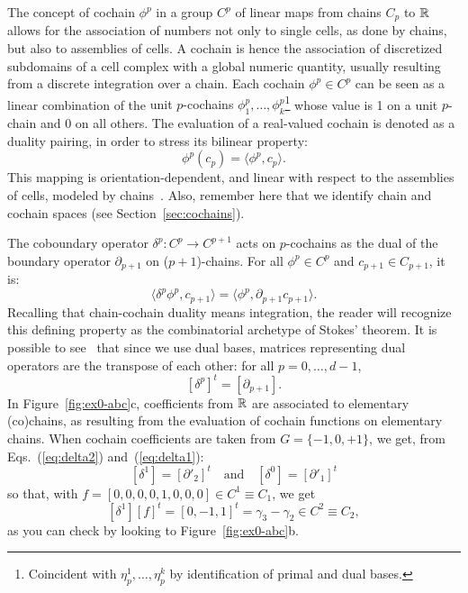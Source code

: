 {
\begin{example}\label{exampleb}
The concept of cochain $\phi^p$ in a group $C^p$ of linear maps from chains $C_p$ to $\mathbb{R}$ allows for the association of numbers not only to single cells, as done by chains, but also to assemblies of cells. 
{A cochain is hence the association of  discretized subdomains of a cell complex with a global numeric quantity, usually resulting from a discrete integration over a chain. }
Each cochain $\phi^p \in C^p$ can be seen as a linear combination of the {
unit $p$-cochains $\phi_1^p,\ldots, \phi_k^p$}\footnote{{Coincident with $\eta^1_p,\ldots, \eta^k_p$ by identification of primal and dual bases.}} whose value is 1 on a unit $p$-chain and 0 on all others.
The evaluation of a real-valued cochain is denoted as a duality pairing, in order to stress its bilinear property:
\[
\phi^p ( c_p ) = \langle \phi^p, c_p \rangle .
\]
This mapping is orientation-dependent, and linear with respect to the assemblies of cells, modeled by chains~\cite{hinzl:thesis:2007}. Also, remember here that we identify chain and cochain spaces (see Section~\ref{sec:cochains}).
\end{example}
}


{
\begin{example}[Coboundary]\label{examplee}
The coboundary operator $\delta^p : C^p \to C^{p+1}$  acts on $p$-cochains as the dual of the boundary operator $\partial_{p+1}$ on ($p+1$)-chains. For all $\phi^p \in C^p$ and $c_{p+1} \in C_{p+1}$, it is:
\[
\langle \delta^p \phi^p, c_{p+1} \rangle = \langle \phi^p, \partial_{p+1} c_{p+1} \rangle.
\]
 Recalling that chain-cochain duality means integration, the reader will recognize this defining property as the combinatorial archetype of Stokes' theorem. 
 It is possible to see~\cite{DiCarlo:2009:DPU:1629255.1629273} that since we use dual bases, matrices representing dual operators are the transpose of each other: for all $p = 0,\ldots,d-1$, 
\[
  [\delta^p]^t = [\partial_{p+1}] .
\]
In Figure~\ref{fig:ex0-abc}c, coefficients from $\mathbb{R}$ are associated to elementary (co)chains, as resulting from the evaluation of cochain functions on elementary chains. 
When cochain coefficients are taken from $G=\{-1,0,+1\}$, we get, from Eqs.~(\ref{eq:delta2}) and~(\ref{eq:delta1}):
\[
[\delta^1] = [\partial'_2]^t\quad\mbox{and}\quad [\delta^0] = [\partial'_1]^t
\]
so that, with $f = [0,0,0,0,1,0,0,0]\in C^1\equiv C_1$, we get
\[
[\delta^1][f]^t = [0,-1,1]^t = \gamma_3-\gamma_2 \in C^2\equiv C_2,
\] 
as you can check by looking to Figure~\ref{fig:ex0-abc}b.
\end{example}
}

